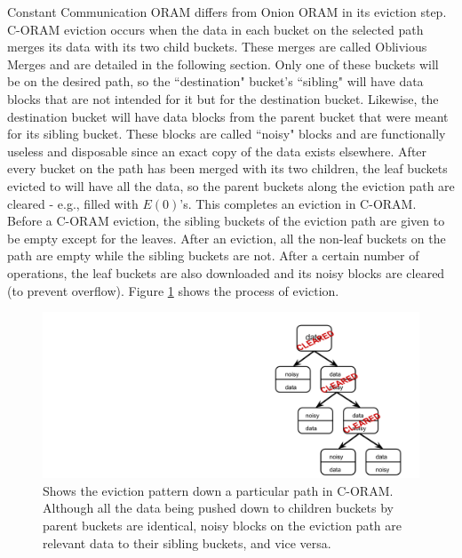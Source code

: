 \documentclass[12pt, oneside]{article}   	%
\begin{document}
Constant Communication ORAM differs from Onion ORAM in its eviction step. C-ORAM eviction occurs when the data in each bucket on the selected path merges its data with its two child buckets. These merges are called Oblivious Merges and are detailed in the following section. Only one of these buckets will be on the desired path, so the ``destination" bucket's ``sibling" will have data blocks that are not intended for it but for the destination bucket. Likewise, the destination bucket will have data blocks from the parent bucket that were meant for its sibling bucket. These blocks are called ``noisy" blocks and are functionally useless and disposable since an exact copy of the data exists elsewhere. After every bucket on the path has been merged with its two children, the leaf buckets evicted to will have all the data, so the parent buckets along the eviction path are cleared - e.g., filled with $E (0)$'s. This completes an eviction in C-ORAM. Before a C-ORAM eviction, the sibling buckets of the eviction path are given to be empty except for the leaves. After an eviction, all the non-leaf buckets on the path are empty while the sibling buckets are not. After a certain number of operations, the leaf buckets are also downloaded and its noisy blocks are cleared (to prevent overflow). Figure \ref{fig:c-evict} shows the process of eviction. 


\begin{figure}[h!]
  \includegraphics[width=\linewidth]{c-evict.png}
  \caption{Shows the eviction pattern down a particular path in C-ORAM. Although all the data being pushed down to children buckets by parent buckets are identical, noisy blocks on the eviction path are relevant data to their sibling buckets, and vice versa.}
  \label{fig:c-evict}
\end{figure}
\end{document}
